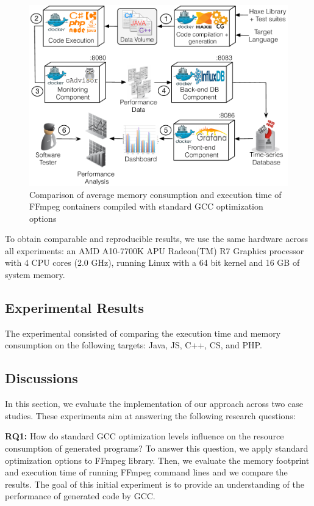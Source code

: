 \begin{figure}[hbt]
	\centering
	\includegraphics[width=1\linewidth]{Ressources/settingup.pdf}
	\caption{Comparison of average memory consumption and execution time of FFmpeg containers compiled with standard GCC optimization options}
\end{figure}
To obtain comparable and reproducible results, we use the
same hardware across all experiments: an AMD A10-7700K
APU Radeon(TM) R7 Graphics processor with 4 CPU cores
(2.0 GHz), running Linux with a 64 bit kernel and 16 GB of
system memory.

\subsection{Experimental Results}
The experimental consisted of comparing the execution time and memory consumption on the following targets: Java, JS, C++, CS, and PHP.


\subsection{Discussions}
\iffalse
In this section, we evaluate the implementation of our approach across two case studies. These experiments aim at answering the following research questions:

\textbf{RQ1:} How do standard GCC optimization levels influence on the resource consumption of generated programs?
To answer this question, we apply standard optimization options to FFmpeg library. Then, we evaluate the memory footprint and execution time of running FFmpeg command lines and we compare the results. The goal of this initial experiment is to
provide an understanding of the performance of generated code by GCC.

